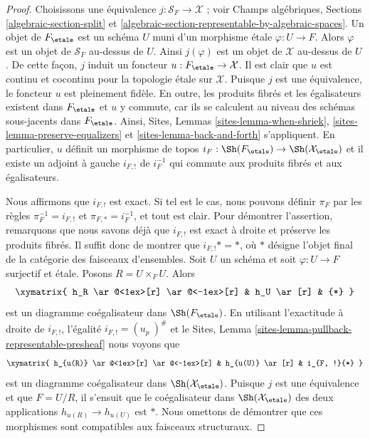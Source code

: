 \begin{proof}
Choisissons une équivalence $j : \mathcal{S}_F \to \mathcal{X}$ ; voir
Champs algébriques, Sections \ref{algebraic-section-split} et
\ref{algebraic-section-representable-by-algebraic-spaces}.
Un objet de $F_\etale$ est un schéma $U$ muni d'un
morphisme étale $\varphi : U \to F$. Alors $\varphi$ est un objet
de $\mathcal{S}_F$ au-dessus de $U$. Ainsi $j(\varphi)$ est un objet de
$\mathcal{X}$ au-dessus de $U$. De cette façon, $j$ induit un foncteur
$u : F_\etale \to \mathcal{X}$. Il est clair que
$u$ est continu et cocontinu pour la topologie étale sur
$\mathcal{X}$. Puisque $j$ est une équivalence, le foncteur $u$ est pleinement
fidèle. En outre, les produits fibrés et les égalisateurs existent dans $F_\etale$
et $u$ y commute, car ils se calculent au niveau
des schémas sous-jacents dans $F_\etale$. Ainsi,
Sites, Lemmas \ref{sites-lemma-when-shriek},
\ref{sites-lemma-preserve-equalizers} et
\ref{sites-lemma-back-and-forth}
s'appliquent. En particulier, $u$ définit un morphisme de topos
$i_F : \Sh(F_\etale) \to \Sh(\mathcal{X}_\etale)$
et il existe un adjoint à gauche $i_{F, !}$ de $i_F^{-1}$ qui commute
aux produits fibrés et aux égalisateurs.

\medskip\noindent
Nous affirmons que $i_{F, !}$ est exact. Si tel est le cas, nous pouvons définir
$\pi_F$ par les règles $\pi_F^{-1} = i_{F, !}$ et $\pi_{F, *} = i_F^{-1}$,
et tout est clair. Pour démontrer l'assertion, remarquons que nous savons déjà
que $i_{F, !}$
est exact à droite et préserve les produits fibrés. Il suffit donc de montrer
que $i_{F, !}* = *$, où $*$ désigne l'objet final de la catégorie
des faisceaux d'ensembles. Soit $U$ un schéma et soit
$\varphi : U \to F$ surjectif et étale. Posons $R = U \times_F U$.
Alors
$$
\xymatrix{
h_R \ar@<1ex>[r] \ar@<-1ex>[r] & h_U \ar[r] & {*}
}
$$
est un diagramme coégalisateur dans $\Sh(F_\etale)$. En utilisant
l'exactitude à droite de $i_{F, !}$, l'égalité $i_{F, !} = (u_p\ )^\#$ et le
Sites, Lemma \ref{sites-lemma-pullback-representable-presheaf}
nous voyons que
$$
\xymatrix{
h_{u(R)} \ar@<1ex>[r] \ar@<-1ex>[r] & h_{u(U)} \ar[r] & i_{F, !}{*}
}
$$
est un diagramme coégalisateur dans $\Sh(\mathcal{X}_\etale)$. Puisque
$j$ est une équivalence et que $F = U/R$, il s'ensuit que
le coégalisateur dans $\Sh(\mathcal{X}_\etale)$ des
deux applications $h_{u(R)} \to h_{u(U)}$ est $*$. Nous omettons de démontrer que
ces morphismes sont compatibles aux faisceaux structuraux.
\end{proof}


